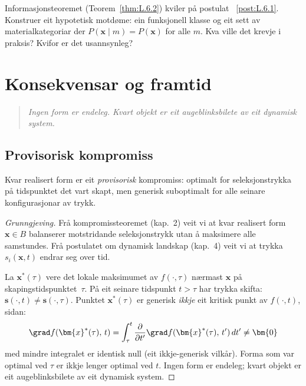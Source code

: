 \begin{exercise}[Nivå 3]\label{ex:8.6}
Informasjonsteoremet (Teorem~\ref{thm:L.6.2}) kviler på postulat~%
\ref{post:L.6.1}. Konstruer eit hypotetisk motdøme: ein
funksjonell klasse og eit sett av materialkategoriar der
$P(\bm{x} \mid m) = P(\bm{x})$ for alle $m$. Kva ville det krevje
i praksis? Kvifor er det usannsynleg?
\end{exercise}


\chapter{Konsekvensar og framtid}
\label{chap:konsekvensar}

\begin{quote}
\itshape
Ingen form er endeleg. Kvart objekt er eit augeblinksbilete
av eit dynamisk system.
\end{quote}


\section{Provisorisk kompromiss}

\begin{satmark}\label{thm:L.9.1}
Kvar realisert form er eit \emph{provisorisk} kompromiss:
optimalt for seleksjonstrykka på tidspunktet det vart skapt,
men generisk suboptimalt for alle seinare konfigurasjonar av trykk.
\end{satmark}

\begin{proof}[Grunngjeving]
Frå kompromissteoremet (kap.~2) veit vi at kvar realisert form
$\bm{x} \in B$ balanserer motstridande seleksjonstrykk utan å
maksimere alle samstundes. Frå postulatet om dynamisk landskap
(kap.~4) veit vi at trykka $s_i(\bm{x}, t)$ endrar seg over tid.

La $\bm{x}^*(\tau)$ vere det lokale maksimumet av $f(\cdot, \tau)$
nærmast $\bm{x}$ på skapingstidspunktet~$\tau$. På eit seinare
tidspunkt $t > \tau$ har trykka skifta:
$\bm{s}(\cdot, t) \neq \bm{s}(\cdot, \tau)$.
Punktet $\bm{x}^*(\tau)$ er generisk \emph{ikkje} eit kritisk
punkt av $f(\cdot, t)$, sidan:
\[
  \grad f(\bm{x}^*(\tau),\, t) =
  \int_\tau^t \frac{\partial}{\partial t'}
  \grad f(\bm{x}^*(\tau),\, t')\, dt'
  \neq \bm{0}
\]
med mindre integralet er identisk null (eit ikkje-generisk
vilkår). Forma som var optimal ved $\tau$ er ikkje lenger optimal
ved $t$. Ingen form er endeleg; kvart objekt er eit augeblinksbilete
av eit dynamisk system.
\end{proof}

